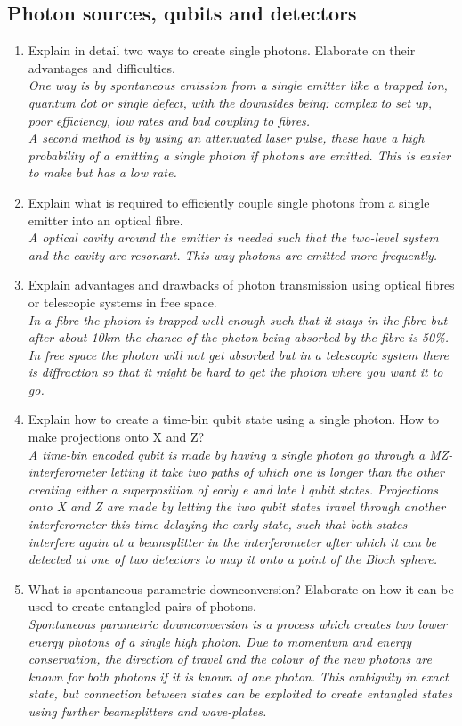 \documentclass[a4paper]{scrartcl}
\newcommand{\qa}[2]{#1\\ \textit{#2}}
\begin{document}
\subsection*{Photon sources, qubits and detectors}
\begin{enumerate}[label=(\alph*)]
  \item \qa{Explain in detail two ways to create single photons. Elaborate on their advantages and difficulties.}{One way is by spontaneous emission from a single emitter like a trapped ion, quantum dot or single defect, with the downsides being: complex to set up, poor efficiency, low rates and bad coupling to fibres.\\ A second method is by using an attenuated laser pulse, these have a high probability of a emitting a single photon if photons are emitted. This is easier to make but has a low rate.}
  \item \qa{Explain what is required to efficiently couple single photons from a single emitter into an optical fibre.}{A optical cavity around the emitter is needed such that the two-level system and the cavity are resonant. This way photons are emitted more frequently.}
  \item \qa{Explain advantages and drawbacks of photon transmission using optical fibres or telescopic systems in free space.}{In a fibre the photon is trapped well enough such that it stays in the fibre but after about 10km the chance of the photon being absorbed by the fibre is 50\%. In free space the photon will not get absorbed but in a telescopic system there is diffraction so that it might be hard to get the photon where you want it to go.}
  \item \qa{Explain how to create a time-bin qubit state using a single photon. How to make projections onto X and Z?}{A time-bin encoded qubit is made by having a single photon go through a MZ-interferometer letting it take two paths of which one is longer than the other creating either a superposition of early e and late l qubit states. Projections onto X and Z are made by letting the two qubit states travel through another interferometer this time delaying the early state, such that both states interfere again at a beamsplitter in the interferometer after which it can be detected at one of two detectors to map it onto a point of the Bloch sphere.}
  \item \qa{What is spontaneous parametric downconversion? Elaborate on how it can be used to create entangled pairs of photons.}{Spontaneous parametric downconversion is a process which creates two lower energy photons of a single high photon. Due to momentum and energy conservation, the direction of travel and the colour of the new photons are known for both photons if it is known of one photon. This ambiguity in exact state, but connection between states can be exploited to create entangled states using further beamsplitters and wave-plates.}

\end{enumerate}
\end{document}
